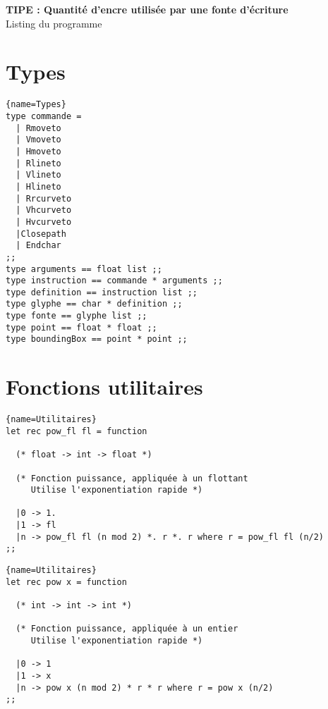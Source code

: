\documentclass[10pt,twoside,a4paper]{article}
\begin{document}
\pagestyle{plain}

\begin{center}
  \Large \textbf{TIPE : Quantité d'encre utilisée par une fonte d'écriture} \\ Listing du programme
\end{center}

\bigskip

\tableofcontents

\newpage

\pagestyle{fancy}

\section{Types}%

\begin{lstlisting}{name=Types}
type commande =
  | Rmoveto
  | Vmoveto
  | Hmoveto
  | Rlineto
  | Vlineto
  | Hlineto
  | Rrcurveto
  | Vhcurveto
  | Hvcurveto
  |Closepath
  | Endchar
;;
type arguments == float list ;;
type instruction == commande * arguments ;;
type definition == instruction list ;;
type glyphe == char * definition ;;
type fonte == glyphe list ;;
type point == float * float ;;
type boundingBox == point * point ;;
\end{lstlisting}

\section{Fonctions utilitaires}%

\begin{lstlisting}{name=Utilitaires}
let rec pow_fl fl = function

  (* float -> int -> float *)

  (* Fonction puissance, appliquée à un flottant
     Utilise l'exponentiation rapide *)

  |0 -> 1.
  |1 -> fl
  |n -> pow_fl fl (n mod 2) *. r *. r where r = pow_fl fl (n/2)
;;
\end{lstlisting}

\begin{lstlisting}{name=Utilitaires}
let rec pow x = function

  (* int -> int -> int *)

  (* Fonction puissance, appliquée à un entier
     Utilise l'exponentiation rapide *)

  |0 -> 1
  |1 -> x
  |n -> pow x (n mod 2) * r * r where r = pow x (n/2)
;;
\end{lstlisting}
\end{document}
